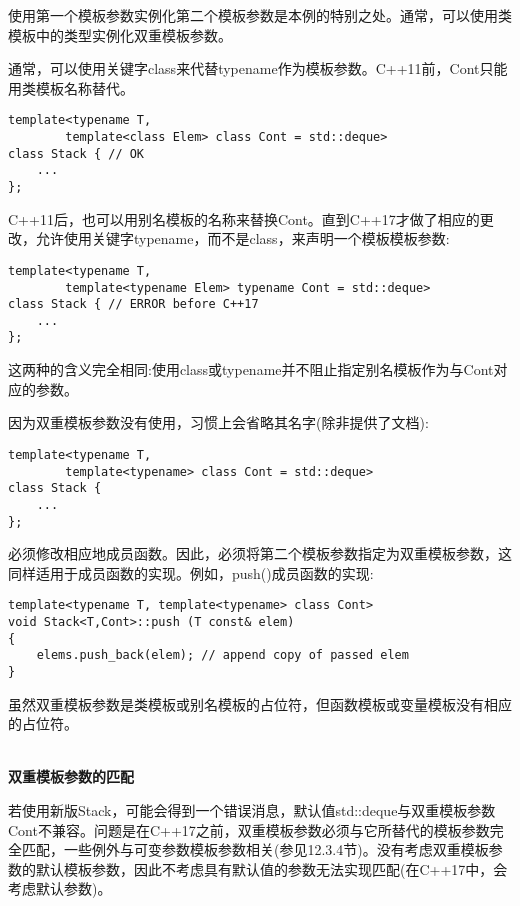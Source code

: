 使用第一个模板参数实例化第二个模板参数是本例的特别之处。通常，可以使用类模板中的类型实例化双重模板参数。

通常，可以使用关键字class来代替typename作为模板参数。C++11前，Cont只能用类模板名称替代。

\begin{lstlisting}[style=styleCXX]
template<typename T,
		template<class Elem> class Cont = std::deque>
class Stack { // OK
	...
};
\end{lstlisting}

C++11后，也可以用别名模板的名称来替换Cont。直到C++17才做了相应的更改，允许使用关键字typename，而不是class，来声明一个模板模板参数:

\begin{lstlisting}[style=styleCXX]
template<typename T,
		template<typename Elem> typename Cont = std::deque>
class Stack { // ERROR before C++17
	...
};
\end{lstlisting}

这两种的含义完全相同:使用class或typename并不阻止指定别名模板作为与Cont对应的参数。

因为双重模板参数没有使用，习惯上会省略其名字(除非提供了文档):

\begin{lstlisting}[style=styleCXX]
template<typename T,
		template<typename> class Cont = std::deque>
class Stack {
	...
};
\end{lstlisting}

必须修改相应地成员函数。因此，必须将第二个模板参数指定为双重模板参数，这同样适用于成员函数的实现。例如，push()成员函数的实现:

\begin{lstlisting}[style=styleCXX]
template<typename T, template<typename> class Cont>
void Stack<T,Cont>::push (T const& elem)
{
	elems.push_back(elem); // append copy of passed elem
}
\end{lstlisting}

虽然双重模板参数是类模板或别名模板的占位符，但函数模板或变量模板没有相应的占位符。

\hspace*{\fill} \\ %
\noindent
\textbf{双重模板参数的匹配}

若使用新版Stack，可能会得到一个错误消息，默认值std::deque与双重模板参数Cont不兼容。问题是在C++17之前，双重模板参数必须与它所替代的模板参数完全匹配，一些例外与可变参数模板参数相关(参见12.3.4节)。没有考虑双重模板参数的默认模板参数，因此不考虑具有默认值的参数无法实现匹配(在C++17中，会考虑默认参数)。

